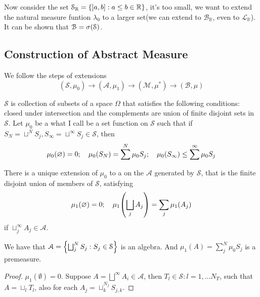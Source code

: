 Now consider the set \(\mathcal{S}_{\mathbb{R}} = \Bqty{\linterval{a}{b} : a\leq b \in \mathbb{R}}\), it's too small, we want to extend the natural measure funtion \(\lambda_{0}\) to a larger set(we can extend to \(\mathcal{B}_{\mathbb{R}}\), even to \(\mathcal{L}_{\mathbb{R}}\)). It can be shown that \(\mathcal{B} = \sigma \pqty{\mathcal{S}}\). 


\subsection{Construction of Abstract Measure}

We follow the steps of extensions
\begin{equation*}
    (\mathcal{S}, \mu_{0}) \to (\mathcal{A}, \mu_{1}) \to (\mathcal{M}, \mu^{*}) \to (\mathcal{B}, \mu)
\end{equation*}

 \(\mathcal{S}\) is collection of subsets of a space \(\Omega\) that satisfies the following conditions: closed under intersection and the complements are union of finite disjoint sets in \(\mathcal{S}\). Let \(\mu_{0}\) be a what I call  be a set function on \(\mathcal{S}\) such that if \(S_{N} = \sqcup^{N}S_{j}, S_{\infty} = \sqcup^{\infty}S_{j} \in \mathcal{S}\), then
\begin{equation*}
    \mu_{0}(\emptyset) = 0 ; \quad \mu_{0}\pqty{S_{N}} = \sum^{N} \mu_{0}S_{j}; \quad  \mu_{0}\pqty{S_{\infty}} \leq \sum^{\infty} \mu_{0}S_{j}
\end{equation*} 

There is a unique extension of \(\mu_{0}\) to a  on the  \(\mathcal{A}\) generated by \(\mathcal{S}\), that is the finite disjoint union of members of \(\mathcal{S}\), satisfying 
\begin{equation*}
    \mu_{1}\pqty{\emptyset} = 0; \quad \mu_{1}\pqty{\sqcup_{j} A_{j}} = \sum_{j} \mu_{1}\pqty{A_{j}}
\end{equation*}
if \(\sqcup_{j}^{\infty} A_{j} \in \mathcal{A}\). 



\begin{thm}
    We have that \(\mathcal{A} = \Bqty{\bigsqcup^{N}_{j} S_{j} : S_{j} \in \mathcal{S}}\) is an algebra. And \(\mu_{1}(A) = \sum^{N}_{j} \mu_{0} S_{j}\) is a premeasure. 
\end{thm}

\begin{proof}
    \(\mu_{1}(\emptyset) = 0\). Suppose \(A = \bigsqcup^{\infty} A_{i} \in \mathcal{A}\), then  \(T_{l}\in \mathcal{S}: l = 1,\dots N_T\), such that \(A = \sqcup_{l} T_{l}\), also for each \(A_{j} = \sqcup^{N_{j}}_{k} S_{j,k}\). 
\end{proof}

